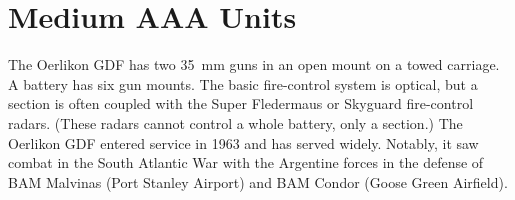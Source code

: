 
\section{Medium AAA Units}


The Oerlikon GDF has two 35~mm guns in an open mount on a towed carriage.
A battery has six gun mounts.
The basic fire-control system is optical, but a section is often coupled with the Super Fledermaus or Skyguard fire-control radars.
(These radars cannot control a whole battery, only a section.)
The Oerlikon GDF entered service in 1963 and has served widely. Notably, it saw combat in the South Atlantic War with the Argentine forces in the defense of BAM Malvinas (Port Stanley Airport) and BAM Condor (Goose Green Airfield).%


